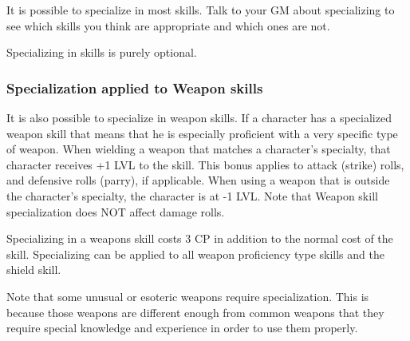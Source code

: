 \documentclass[twoside]{book}
\begin{document}
  
    {  
     It is possible to specialize in most skills. Talk
                 to your GM about specializing to see which skills you
                 think are appropriate and which ones are not. 
    }
  
    {  
     Specializing in skills is purely optional. 
    }
  
    

\subsubsection{Specialization applied to Weapon skills}
    
    {  
     It is also possible to specialize in weapon
                 skills. If a character has a specialized weapon skill
                 that means that he is especially proficient with a very
                 specific type of weapon. When wielding a weapon that
                 matches a character's specialty, that character
                 receives +1 LVL to the skill. This bonus applies to
                 attack (strike) rolls, and defensive rolls (parry), if
                 applicable. When using a weapon that is outside the
                 character's specialty, the character is at -1 LVL.
                 Note that Weapon skill specialization does NOT affect
                 damage rolls. 
    }
  
    {  
     Specializing in a weapons skill costs 3 CP in
                 addition to the normal cost of the skill. Specializing
                 can be applied to all weapon proficiency type skills and
                 the shield skill. 
    }
  
  

  

  
    {  
     Note that some unusual or esoteric weapons require
                 specialization. This is because those weapons are
                 different enough from common weapons that they require
                 special knowledge and experience in order to use them
                 properly. 
    }
  
\end{document}
